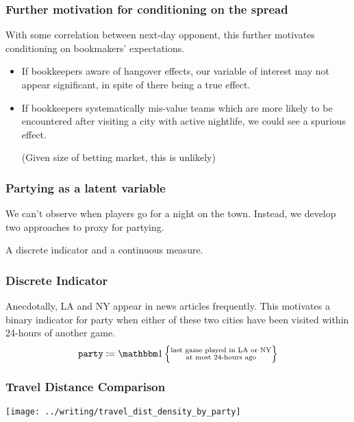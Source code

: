 \documentclass{beamer}
\begin{document}
\begin{frame}   \frametitle{Further motivation for conditioning on the spread}
  \begin{block}{With some correlation between next-day opponent, this further motivates conditioning
  on bookmakers' expectations.}
  \begin{itemize}     \item If bookkeepers aware of hangover effects, our variable of interest may not appear significant, in spite of there being a true effect.

    \item If bookkeepers systematically mis-value teams which are more likely to be encountered after visiting a city with active nightlife, we could see a spurious effect.

      (Given size of betting market, this is unlikely)
    \end{itemize}   \end{block}
\end{frame}

\begin{frame}   \frametitle{Partying as a latent variable}
  \begin{block}{We can't observe when players go for a night on the town.}
    Instead, we develop two approaches to proxy for partying. 

    A discrete indicator and a continuous measure.
  \end{block} \end{frame}

\begin{frame}   \frametitle{Discrete Indicator}
  \begin{block}{Anecdotally, LA and NY appear in news articles frequently.}     This motivates a binary indicator for party when either of these two cities have been visited within 24-hours of another game.
    \[
      \texttt{party} \coloneqq \mathbbm 1 \left \{\substack{\textrm{last game played in LA or NY} \\ \textrm{at most 24-hours ago}}\right \}
    \]   \end{block} \end{frame}


\begin{frame}   
  \frametitle{Travel Distance Comparison}
  \centering \texttt{[image: ../writing/travel\_dist\_density\_by\_party]} 
\end{frame}
\end{document}
